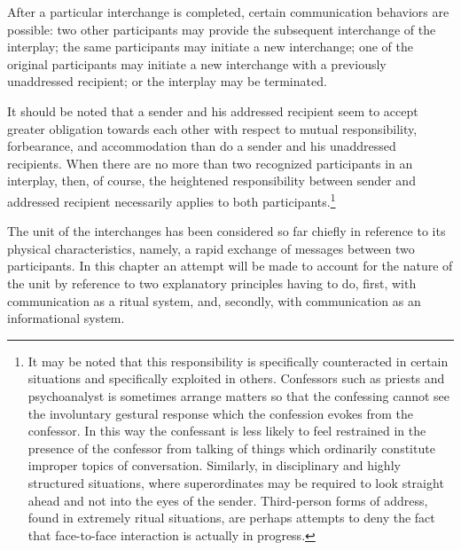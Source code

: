 \documentclass[twoside,symmetric,nobib,justified]{tufte-book}
\begin{document}
\newpage After a particular interchange is completed, certain communication
behaviors are possible: two other participants may provide the
subsequent interchange of the interplay; the same participants may
initiate a new interchange; one of the original participants may
initiate a new interchange with a previously unaddressed recipient; or
the interplay may be terminated.

It should be noted that a sender and his addressed recipient seem to
accept greater obligation towards each other with respect to mutual
responsibility, forbearance, and accommodation than do a sender and his
unaddressed recipients. When there are no more than two recognized
participants in an interplay, then, of course, the heightened
responsibility between sender and addressed recipient necessarily
applies to both participants.\footnote{It may be noted that this
  responsibility is specifically counteracted in certain situations and
  specifically exploited in others. Confessors such as priests and
  psychoanalyst is sometimes arrange matters so that the confessing
  cannot see the involuntary gestural response which the confession
  evokes from the confessor. In this way the confessant is less likely
  to feel restrained in the presence of the confessor from talking of
  things which ordinarily constitute improper topics of conversation.
  Similarly, in disciplinary and highly structured situations, where
  superordinates may be required to look straight ahead and not into the
  eyes of the sender. Third-person forms of address, found in extremely
  ritual situations, are perhaps attempts to deny the fact that
  face-to-face interaction is actually in progress.}

The unit of the interchanges has been considered so far chiefly in
reference to its physical characteristics, namely, a rapid exchange of
messages between two participants. In this chapter an attempt will be
made to account for the nature of the unit by reference to two
explanatory principles having to do, first, with communication as a
ritual system, and, secondly, with communication as an informational
system.
\end{document}
